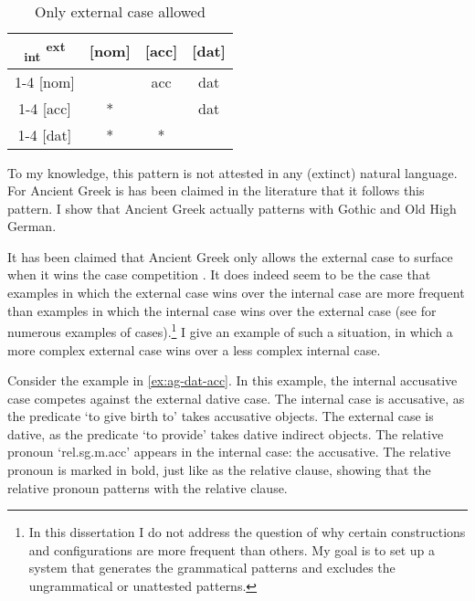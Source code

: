 \begin{table}[H]
  \center
  \caption{Only external case allowed}
  \begin{tabular}{c|c|c|c}
    \toprule
    \textsubscript{\ac{int}} \textsuperscript{\ac{ext}}
           & [\ac{nom}]
           & [\ac{acc}]
           & [\ac{dat}]
           \\ \cmidrule{1-4}
       [\ac{nom}]
           &
           & \ac{acc}
           & \ac{dat}
           \\ \cmidrule{1-4}
       [\ac{acc}]
           & *
           &
           & \ac{dat}
           \\ \cmidrule{1-4}
       [\ac{dat}]
           & *
           & *
           &
           \\
     \bottomrule
  \end{tabular}
    \label{tbl:case-competition-only-ext-repeated}
\end{table}

To my knowledge, this pattern is not attested in any (extinct) natural language. For Ancient Greek is has been claimed in the literature that it follows this pattern. I show that Ancient Greek actually patterns with Gothic and Old High German.

It has been claimed that Ancient Greek only allows the external case to surface when it wins the case competition  \citep[cf.][]{cinqueforthcoming}. It does indeed seem to be the case that examples in which the external case wins over the internal case are more frequent than examples in which the internal case wins over the external case (see \citealt{kakarikos2014} for numerous examples of cases).\footnote{
In this dissertation I do not address the question of why certain constructions and configurations are more frequent than others. My goal is to set up a system that generates the grammatical patterns and excludes the ungrammatical or unattested patterns.
} I give an example of such a situation, in which a more complex external case wins over a less complex internal case.

Consider the example in \ref{ex:ag-dat-acc}. In this example, the internal accusative case competes against the external dative case.
The internal case is accusative, as the predicate  `to give birth to' takes accusative objects.
The external case is dative, as the predicate  `to provide' takes dative indirect objects.
The relative pronoun  `\ac{rel}.\ac{sg}.\ac{m}.\ac{acc}' appears in the internal case: the accusative. The relative pronoun is marked in bold, just like as the relative clause, showing that the relative pronoun patterns with the relative clause.


